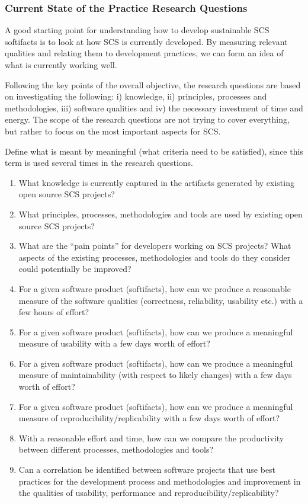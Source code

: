 \documentclass[12pt]{article}
\begin{document}
\subsubsection*{Current State of the Practice Research Questions}

A good starting point for understanding how to develop sustainable SCS softifacts is
to look at how SCS is currently developed.  By measuring relevant qualities and
relating them to development practices, we can form an idea of what is currently
working well.

Following the key points of the overall objective, the research questions are
based on investigating the following: i) knowledge, ii) principles, processes
and methodologies, iii) software qualities and iv) the necessary investment of
time and energy.  The scope of the research questions are not trying to cover
everything, but rather to focus on the most important aspects for SCS.

Define what is meant by meaningful (what criteria need to be satisfied), since
this term is used several times in the research questions.

\begin{enumerate}
\item What knowledge is currently captured in the artifacts generated by
  existing open source SCS projects?
\item What principles, processes, methodologies and tools are used by existing
  open source SCS projects?
\item What are the ``pain points'' for developers working on SCS projects?  What
  aspects of the existing processes, methodologies and tools do they consider
  could potentially be improved?
\item For a given software product (softifacts), how can we produce a
  reasonable measure of the software qualities (correctness, reliability,
  usability etc.) with a few hours of effort?
\item For a given software product (softifacts), how can we produce a
  meaningful measure of usability with a few days worth of effort?
\item For a given software product (softifacts), how can we produce a
  meaningful measure of maintainability (with respect to likely changes) with a
  few days worth of effort?
\item For a given software product (softifacts), how can we produce a
  meaningful measure of reproducibility/replicability with a few days worth of
  effort?
\item With a reasonable effort and time, how can we compare the productivity
  between different processes, methodologies and tools?
\item Can a correlation be identified between software projects that use best 
  practices for the development process and methodologies and improvement in the
  qualities of usability, performance and reproducibility/replicability?
\end{enumerate}
\end{document}
